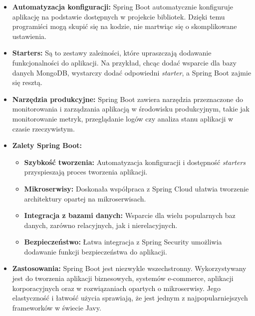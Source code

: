 \begin{itemize}
\item \textbf{Automatyzacja konfiguracji:} Spring Boot automatycznie konfiguruje aplikację na podstawie dostępnych w projekcie bibliotek. Dzięki temu programiści mogą skupić się na kodzie, nie martwiąc się o skomplikowane ustawienia.
\item \textbf{Starters:} Są to zestawy zależności, które upraszczają dodawanie funkcjonalności do aplikacji. Na przykład, chcąc dodać wsparcie dla bazy danych MongoDB, wystarczy dodać odpowiedni \textit{starter}, a Spring Boot zajmie się resztą.

\item \textbf{Narzędzia produkcyjne:} Spring Boot zawiera narzędzia przeznaczone do monitorowania i zarządzania aplikacją w środowisku produkcyjnym, takie jak monitorowanie metryk, przeglądanie logów czy analiza stanu aplikacji w czasie rzeczywistym.

\item \textbf{Zalety Spring Boot:}
\begin{itemize}
    \item \textbf{Szybkość tworzenia:} Automatyzacja konfiguracji i dostępność
    \textit{starters} przyspieszają proces tworzenia aplikacji.
    \item \textbf{Mikroserwisy:} Doskonała współpraca z Spring Cloud ułatwia tworzenie architektury opartej na mikroserwisach.
    \item \textbf{Integracja z bazami danych:} Wsparcie dla wielu popularnych baz danych, zarówno relacyjnych, jak i nierelacyjnych.
    \item \textbf{Bezpieczeństwo:} Łatwa integracja z Spring Security umożliwia dodawanie funkcji bezpieczeństwa do aplikacji.
\end{itemize}

\item \textbf{Zastosowania:} Spring Boot jest niezwykle wszechstronny. Wykorzystywany jest do tworzenia aplikacji biznesowych, systemów e-commerce, aplikacji korporacyjnych oraz w rozwiązaniach opartych o mikroserwisy. Jego elastyczność i łatwość użycia sprawiają, że jest jednym z najpopularniejszych frameworków w świecie Javy\cite{springbootSpecs}.
\end{itemize}

